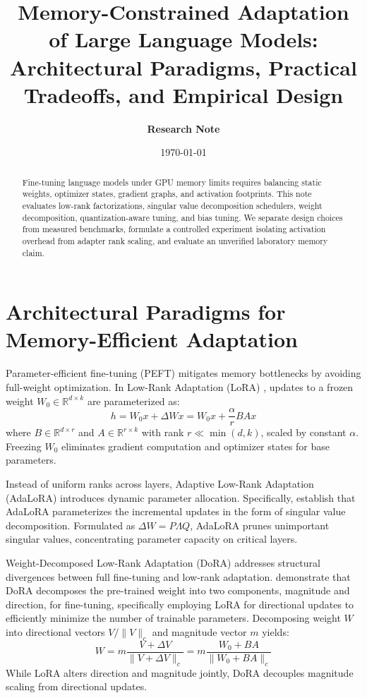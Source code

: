 \documentclass[11pt,a4paper]{article}
\title{\textbf{Memory-Constrained Adaptation of Large Language Models:}\\
Architectural Paradigms, Practical Tradeoffs, and Empirical Design}
\author{\textbf{Research Note}}
\date{\today}
\begin{document}
\maketitle

\begin{abstract}
Fine-tuning language models under GPU memory limits requires balancing static weights, optimizer states, gradient graphs, and activation footprints. This note evaluates low-rank factorizations, singular value decomposition schedulers, weight decomposition, quantization-aware tuning, and bias tuning. We separate design choices from measured benchmarks, formulate a controlled experiment isolating activation overhead from adapter rank scaling, and evaluate an unverified laboratory memory claim.
\end{abstract}

\section{Architectural Paradigms for Memory-Efficient Adaptation}

Parameter-efficient fine-tuning (PEFT) mitigates memory bottlenecks by avoiding full-weight optimization. In Low-Rank Adaptation (LoRA) \citep{hu2021lora}, updates to a frozen weight $W_0 \in \mathbb{R}^{d \times k}$ are parameterized as:
\begin{equation}
h = W_0 x + \Delta W x = W_0 x + \frac{\alpha}{r} B A x
\end{equation}
where $B \in \mathbb{R}^{d \times r}$ and $A \in \mathbb{R}^{r \times k}$ with rank $r \ll \min(d, k)$, scaled by constant $\alpha$. Freezing $W_0$ eliminates gradient computation and optimizer states for base parameters.

Instead of uniform ranks across layers, Adaptive Low-Rank Adaptation (AdaLoRA) \citep{zhang2023adalora} introduces dynamic parameter allocation. Specifically, \citet{zhang2023adalora} establish that AdaLoRA parameterizes the incremental updates in the form of singular value decomposition. Formulated as $\Delta W = P \Lambda Q$, AdaLoRA prunes unimportant singular values, concentrating parameter capacity on critical layers.

Weight-Decomposed Low-Rank Adaptation (DoRA) \citep{liu2024dora} addresses structural divergences between full fine-tuning and low-rank adaptation. \citet{liu2024dora} demonstrate that DoRA decomposes the pre-trained weight into two components, magnitude and direction, for fine-tuning, specifically employing LoRA for directional updates to efficiently minimize the number of trainable parameters. Decomposing weight $W$ into directional vectors $V / \|V\|_c$ and magnitude vector $m$ yields:
\begin{equation}
W = m \frac{V + \Delta V}{\|V + \Delta V\|_c} = m \frac{W_0 + B A}{\|W_0 + B A\|_c}
\end{equation}
While LoRA alters direction and magnitude jointly, DoRA decouples magnitude scaling from directional updates.
\end{document}
